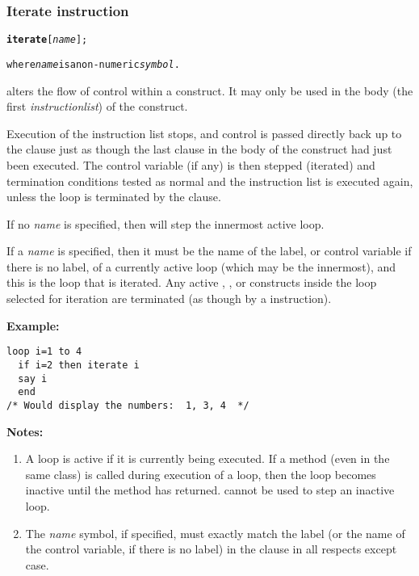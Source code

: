 \subsubsection{Iterate instruction}
\index{,}
\begin{shaded}
\begin{alltt}
\textbf{iterate} [\emph{name}];

where \emph{name} is a non-numeric \emph{symbol}.
\end{alltt}
\end{shaded}
  alters the flow of control within a 
construct.
It may only be used in the body (the first \emph{instructionlist})
of the construct.

Execution of the instruction list stops, and control is passed
directly back up to the  clause just as though the last
clause in the body of the construct had just been executed.
The control variable (if any) is then stepped (iterated) and termination
conditions tested as normal and the instruction list is executed again,
unless the loop is terminated by the  clause.

If no \emph{name} is specified, then  will step
the innermost active loop.
 
If a \emph{name} is specified, then it must be the name of the
label, or control variable if there is no label, of a currently active
loop (which may be the innermost), and this is the loop that is
iterated.
Any active , , or  constructs
inside the loop selected for iteration are terminated (as though by a
 instruction).

\textbf{Example:}
\begin{lstlisting}
loop i=1 to 4
  if i=2 then iterate i
  say i
  end
/* Would display the numbers:  1, 3, 4  */
\end{lstlisting}
 \textbf{Notes:}
\begin{enumerate}
\item A loop is active if it is currently being executed.
If a method (even in the same class) is called during execution of a
loop, then the loop becomes inactive until the method has returned.
 cannot be used to step an inactive loop.
\item The \emph{name} symbol, if specified, must exactly match the
label (or the name of the control variable, if there is no label) in the
 clause in all respects except case.
\end{enumerate}
